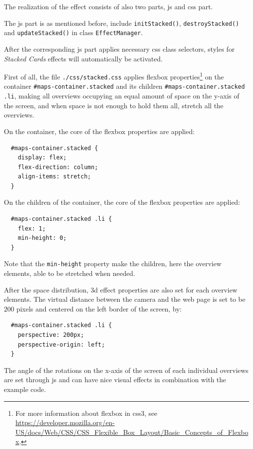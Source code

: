 The realization of the effect consists of also two parts, \gls{js} and \gls{css} part.

The \gls{js} part is as mentioned before, include \texttt{initStacked()}, \texttt{destroyStacked()} and \texttt{updateStacked()} in class \texttt{EffectManager}.

After the corresponding \gls{js} part applies necessary \gls{css} class selectors, styles for \emph{Stacked Cards} effects will automatically be activated.

First of all, the file \texttt{./css/stacked.css} applies flexbox properties\footnote{ For more information about flexbox in \gls{css3}, see \url{https://developer.mozilla.org/en-US/docs/Web/CSS/CSS_Flexible_Box_Layout/Basic_Concepts_of_Flexbox}.} on the container \texttt{\#maps-container.stacked} and its children \texttt{\#maps-container.stacked .li}, making all overviews occupying an equal amount of space on the y-axis of the screen, and when space is not enough to hold them all, stretch all the overviews.

On the container, the core of the flexbox properties are applied:

\begin{verbatim}
  #maps-container.stacked {
    display: flex;
    flex-direction: column;
    align-items: stretch;
  }
\end{verbatim}

On the children of the container, the core of the flexbox properties are applied:

\begin{verbatim}
  #maps-container.stacked .li {
    flex: 1;
    min-height: 0;
  }
\end{verbatim}

Note that the \texttt{min-height} property make the children, here the overview elements, able to be stretched when needed.

After the space distribution, 3d effect properties are also set for each overview elements. The virtual distance between the camera and the web page is set to be $200$ pixels and centered on the left border of the screen, by:

\begin{verbatim}
  #maps-container.stacked .li {
    perspective: 200px;
    perspective-origin: left;
  }
\end{verbatim}

The angle of the rotations on the x-axis of the screen of each individual overviews are set through \gls{js} and can have nice visual effects in combination with the example code.

